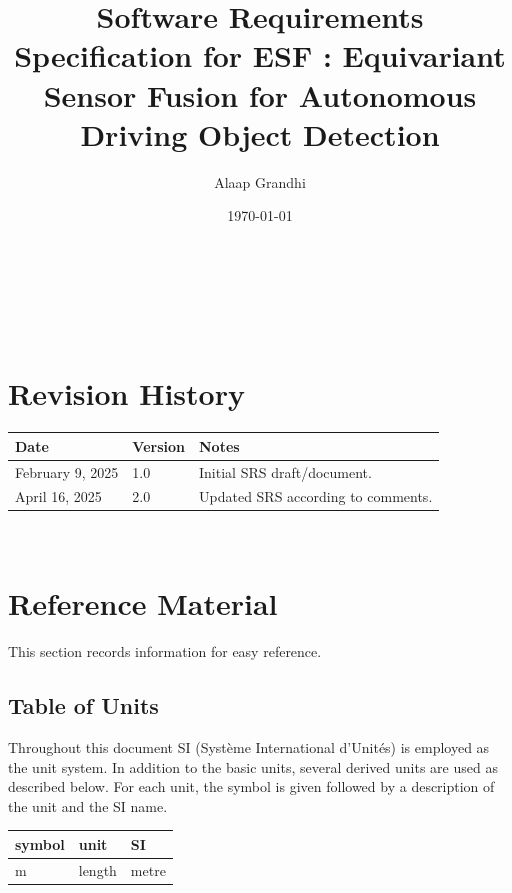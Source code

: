 \documentclass[12pt]{article}
\newcommand{\ProjectName}{ESF }
\begin{document}
\title{Software Requirements Specification for \ProjectName: Equivariant Sensor Fusion for Autonomous Driving Object Detection} 
\author{Alaap Grandhi}
\date{\today}
	
\maketitle

~\newpage


\tableofcontents

~\newpage

\section*{Revision History}

\begin{tabularx}{\textwidth}{p{3cm}p{2cm}X}
\toprule {\bf Date} & {\bf Version} & {\bf Notes}\\
\midrule
February 9, 2025 & 1.0 & Initial SRS draft/document.\\
\midrule
April 16, 2025 & 2.0 & Updated SRS according to comments.\\
\bottomrule
\end{tabularx}

~\newpage

\section{Reference Material}

This section records information for easy reference.

\subsection{Table of Units}

Throughout this document SI (Syst\`{e}me International d'Unit\'{e}s) is employed
as the unit system.  In addition to the basic units, several derived units are
used as described below.  For each unit, the symbol is given followed by a
description of the unit and the SI name.
~\newline

\renewcommand{\arraystretch}{1.2}
  \noindent \begin{tabular}{l l l} 
    \toprule		
    \textbf{symbol} & \textbf{unit} & \textbf{SI}\\
    \midrule 
    \si{\metre} & length & metre\\
    \bottomrule
  \end{tabular}
\end{document}
